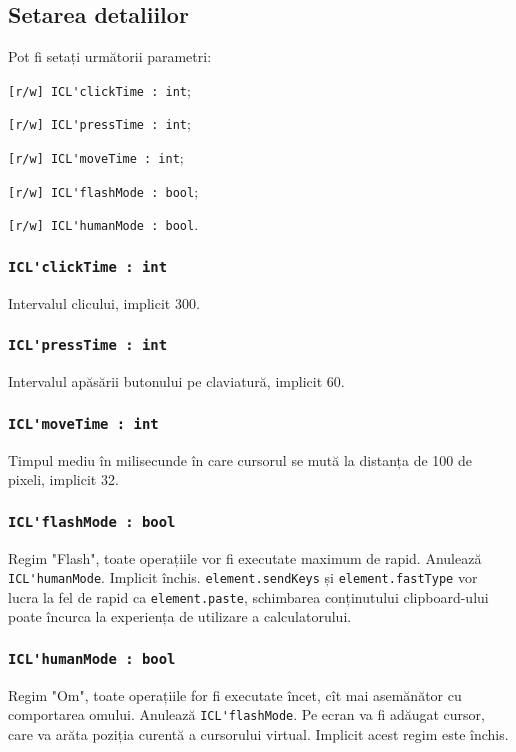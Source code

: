 \subsection{Setarea detaliilor}

Pot fi setați următorii parametri:
\begin{icItems}
	\item \lstinline|[r/w] ICL'clickTime : int|;
	\item \lstinline|[r/w] ICL'pressTime : int|;
	\item \lstinline|[r/w] ICL'moveTime : int|;
	\item \lstinline|[r/w] ICL'flashMode : bool|;
	\item \lstinline|[r/w] ICL'humanMode : bool|.
\end{icItems}

\subsubsection{\lstinline|ICL'clickTime : int|}

Intervalul clicului, implicit 300.

\subsubsection{\lstinline|ICL'pressTime : int|}

Intervalul apăsării butonului pe claviatură, implicit 60.

\subsubsection{\lstinline|ICL'moveTime : int|}

Timpul mediu în milisecunde în care cursorul se mută la distanța de 100 de pixeli, implicit 32.

\subsubsection{\lstinline|ICL'flashMode : bool|}

Regim "Flash", toate operațiile vor fi executate maximum de rapid. Anulează \lstinline|ICL'humanMode|. Implicit închis. \lstinline|element.sendKeys| și \lstinline|element.fastType| vor lucra la fel de rapid ca \lstinline|element.paste|, schimbarea conținutului clipboard-ului poate încurca la experiența de utilizare a calculatorului.

\subsubsection{\lstinline|ICL'humanMode : bool|}

Regim "Om", toate operațiile for fi executate încet, cît mai asemănător cu comportarea omului. Anulează \lstinline|ICL'flashMode|. Pe ecran va fi adăugat cursor, care va arăta poziția curentă a cursorului virtual. Implicit acest regim este închis.

